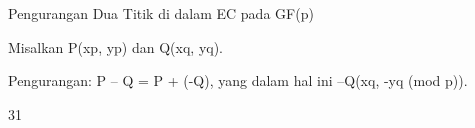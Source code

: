 \documentclass{article}
\begin{document}

Pengurangan Dua Titik di dalam EC pada GF(p)

Misalkan P(xp, yp) dan Q(xq, yq).  

Pengurangan: P – Q  = P + (-Q), yang dalam hal ini –Q(xq, -yq (mod p)). 

31
\end{document}
